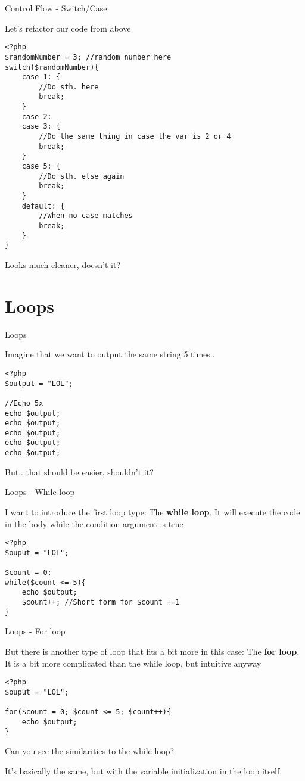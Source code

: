\begin{frame}[fragile]{Control Flow - Switch/Case}

Let's refactor our code from above
\begin{lstlisting}
<?php
$randomNumber = 3; //random number here
switch($randomNumber){
	case 1: {
		//Do sth. here
		break;
	}
	case 2:
	case 3: {
		//Do the same thing in case the var is 2 or 4
		break;
	}
	case 5: {
		//Do sth. else again
		break;
	}
	default: {
		//When no case matches
		break;
	}
}
\end{lstlisting} 
\pause

Looks much cleaner, doesn't it?

\end{frame}

\section{Loops}

\begin{frame}[fragile]{Loops}

Imagine that we want to output the same string 5 times.. \pause

\begin{lstlisting}
<?php
$output = "LOL";

//Echo 5x
echo $output;
echo $output;
echo $output;
echo $output;
echo $output;
\end{lstlisting} 
\pause

But.. that should be easier, shouldn't it?

\end{frame}


\begin{frame}[fragile]{Loops - While loop}

I want to introduce the first loop type: The \textbf{while loop}.
It will execute the code in the body while the condition argument is true  \pause

\begin{lstlisting}
<?php
$ouput = "LOL";

$count = 0;
while($count <= 5){
	echo $output;
	$count++; //Short form for $count +=1
}
\end{lstlisting} 

\end{frame}

\begin{frame}[fragile]{Loops - For loop}

But there is another type of loop that fits a bit more in this case: The \textbf{for loop}.
It is a bit more complicated than the while loop, but intuitive anyway\pause

\begin{lstlisting}
<?php
$ouput = "LOL";

for($count = 0; $count <= 5; $count++){
	echo $output;
}
\end{lstlisting} \pause

Can you see the similarities to the while loop?

It's basically the same, but with the variable initialization in the loop itself.
\end{frame}

